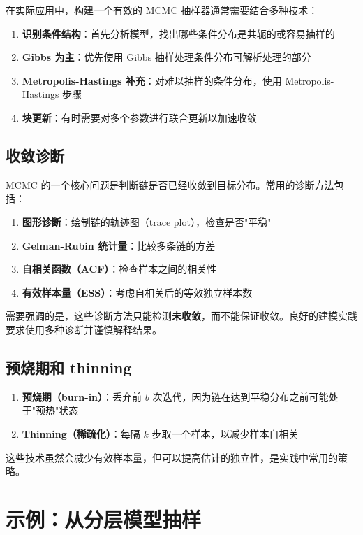 在实际应用中，构建一个有效的 MCMC 抽样器通常需要结合多种技术：

\begin{enumerate}
  \item \textbf{识别条件结构}：首先分析模型，找出哪些条件分布是共轭的或容易抽样的
  \item \textbf{Gibbs 为主}：优先使用 Gibbs 抽样处理条件分布可解析处理的部分
  \item \textbf{Metropolis-Hastings 补充}：对难以抽样的条件分布，使用 Metropolis-Hastings 步骤
  \item \textbf{块更新}：有时需要对多个参数进行联合更新以加速收敛
\end{enumerate}

\subsection{收敛诊断}

MCMC 的一个核心问题是判断链是否已经收敛到目标分布。常用的诊断方法包括：

\begin{enumerate}
  \item \textbf{图形诊断}：绘制链的轨迹图（trace plot），检查是否"平稳"
  \item \textbf{Gelman-Rubin 统计量}：比较多条链的方差
  \item \textbf{自相关函数（ACF）}：检查样本之间的相关性
  \item \textbf{有效样本量（ESS）}：考虑自相关后的等效独立样本数
\end{enumerate}

需要强调的是，这些诊断方法只能检测\textbf{未收敛}，而不能保证收敛。良好的建模实践要求使用多种诊断并谨慎解释结果。

\subsection{预烧期和 thinning}

\begin{enumerate}
  \item \textbf{预烧期（burn-in）}：丢弃前 $b$ 次迭代，因为链在达到平稳分布之前可能处于"预热"状态
  \item \textbf{Thinning（稀疏化）}：每隔 $k$ 步取一个样本，以减少样本自相关
\end{enumerate}

这些技术虽然会减少有效样本量，但可以提高估计的独立性，是实践中常用的策略。

\section{示例：从分层模型抽样}

